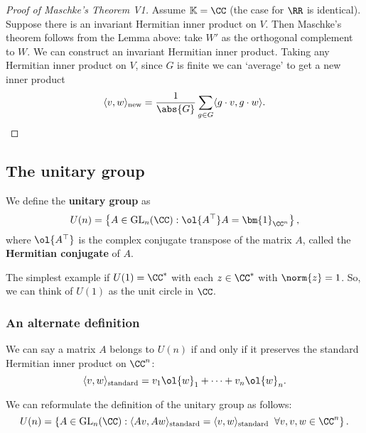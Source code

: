 \documentclass[12pt, a4paper]{article}
\newcommand{\gl}{\text{GL}}
\newcommand{\KK}{\mathbb{K}}
\begin{document}
\begin{proof}[Proof of Maschke's Theorem V1]
    Assume \(\KK=\CC\) (the case for \(\RR\) is identical). Suppose there is an invariant Hermitian inner product on \(V\). Then Maschke's theorem follows from the Lemma above: take \(W'\) as the orthogonal complement to \(W\). We can construct an invariant Hermitian inner product. Taking any Hermitian inner product on \(V\), since \(G\) is finite we can `average' to get a new inner product 
    \[\langle v,w \rangle_{\text{new}}=\frac{1}{\abs{G}} \sum_{g\in G} \langle g\cdot v, g\cdot w \rangle.\]
\end{proof}

\subsection{The unitary group}

\begin{definition}
    We define the \textbf{unitary group}  as 
    \[U(n) = \left\{ A \in \gl_n(\CC) : \ol{A^{\top}}A  = \bm{1}_{\CC^n} \right\},\]
    where \(\ol{A^{\top}}\) is the complex conjugate transpose of the matrix \(A\), called the \textbf{Hermitian conjugate} of \(A\).
\end{definition}

\begin{example}
    The simplest example if \(U(1) =\CC^*\) with each \(z \in \CC^*\) with \(\norm{z}=1\). So, we can think of \(U(1)\) as the unit circle in \(\CC\).
\end{example}

\subsubsection{An alternate definition}

We can say a matrix \(A\) belongs to \(U(n)\) if and only if it preserves the standard Hermitian inner product on \(\CC^n\):
\[\langle v, w\rangle_{\text{standard}}=v_1\ol{w}_1+\cdots+v_n \ol{w}_n.\]

\begin{definition}
    We can reformulate the definition of the unitary group as follows:
    \[U(n)=\left\{ A \in \gl_n(\CC) : \langle Av, Aw\rangle_{\text{standard}} =\langle v, w\rangle_{\text{standard}} \;\; \forall v,v,w \in \CC^n\right\}.\]
\end{definition}
\end{document}
